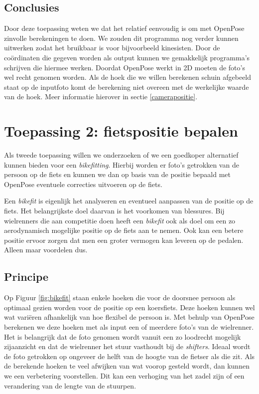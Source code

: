 \documentclass[a4paper,twoside,kulak]{kulakreport}
\begin{document}
\subsection{Conclusies}
Door deze  toepassing weten we dat het relatief eenvoudig is om met OpenPose zinvolle berekeningen te doen. We zouden dit programma nog verder kunnen uitwerken zodat het bruikbaar is voor bijvoorbeeld kinesisten. Door de coördinaten die gegeven worden als output kunnen we gemakkelijk programma's schrijven die hiermee werken. Doordat OpenPose werkt in 2D moeten de foto's wel recht genomen worden. Als de hoek die we willen berekenen schuin afgebeeld staat op de inputfoto komt de berekening niet overeen met de werkelijke waarde van de hoek. Meer informatie hierover in sectie \ref{camerapositie}.


\section{Toepassing 2: fietspositie bepalen}
Als tweede toepassing willen we onderzoeken of we een goedkoper alternatief kunnen bieden voor een \textit{bikefitting}. Hierbij worden er foto's getrokken van de persoon op de fiets en kunnen we dan op basis van de positie bepaald met OpenPose eventuele correcties uitvoeren op de fiets.

Een \emph{bikefit} is eigenlijk het analyseren en eventueel aanpassen van de positie op de fiets. Het belangrijkste doel daarvan is het voorkomen van blessures. Bij wielrenners die aan competitie doen heeft een \emph{bikefit} ook als doel om een zo aerodynamisch mogelijke positie op de fiets aan te nemen. Ook kan een betere positie ervoor zorgen dat men een groter vermogen kan leveren op de pedalen. Alleen maar voordelen dus.

\subsection{Principe}

Op Figuur \ref{fig:bikefit} staan enkele hoeken die voor de doorsnee persoon als optimaal gezien worden voor de positie op een koersfiets. Deze hoeken kunnen wel wat variëren afhankelijk van hoe flexibel de persoon is. Met behulp van OpenPose berekenen we deze hoeken met als input een of meerdere foto's van de wielrenner. Het is belangrijk dat de foto genomen wordt vanuit een zo loodrecht mogelijk zijaanzicht en dat de wielrenner het stuur vasthoudt bij de \emph{shifters}. Ideaal wordt de foto getrokken op ongeveer de helft van de hoogte van de fietser als die zit. Als de berekende hoeken te veel afwijken van wat voorop gesteld wordt, dan kunnen we een verbetering voorstellen. Dit kan een verhoging van het zadel zijn of een verandering van de lengte van de stuurpen.
\end{document}
